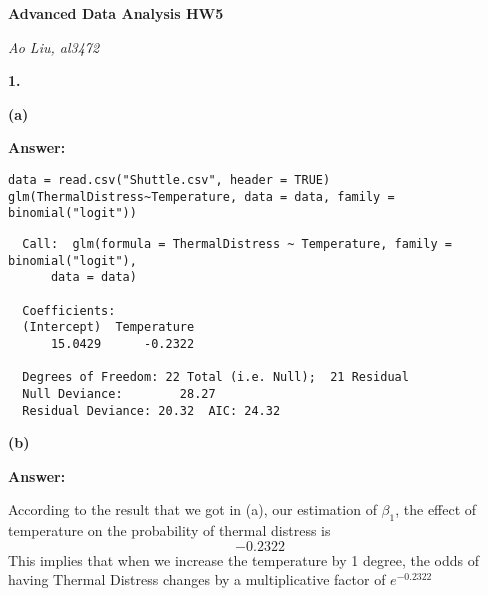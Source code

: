 \documentclass[letterpaper,11pt]{article}
\begin{document}
\begin{center}
	\textbf{\Huge{Advanced Data Analysis HW5}}
\end{center}

\begin{center}
	\textsl{Ao Liu, al3472}
\end{center}

\bigbreak
\bigbreak
\bigbreak



\begin{addmargin}[-2em]{0em}
  \large{\textbf{1. }}
\end{addmargin}
\textbf{}\par

\begin{addmargin}[-1.1em]{0em}
  \textbf{(a)}\par
\end{addmargin}
\textbf{}\par
\bigbreak
\begin{addmargin}[-0.5em]{0em}
  \textbf{Answer: }
\end{addmargin}

\begin{lstlisting}
data = read.csv("Shuttle.csv", header = TRUE)
glm(ThermalDistress~Temperature, data = data, family = binomial("logit"))
\end{lstlisting}

\begin{lstlisting}
  Call:  glm(formula = ThermalDistress ~ Temperature, family = binomial("logit"),
      data = data)

  Coefficients:
  (Intercept)  Temperature
      15.0429      -0.2322

  Degrees of Freedom: 22 Total (i.e. Null);  21 Residual
  Null Deviance:	    28.27
  Residual Deviance: 20.32 	AIC: 24.32
\end{lstlisting}


\begin{addmargin}[-1.1em]{0em}
  \textbf{(b)}\par
\end{addmargin}
\textbf{}\par
\bigbreak
\begin{addmargin}[-0.5em]{0em}
  \textbf{Answer: }
\end{addmargin}

According to the result that we got in (a), our estimation of $\beta_1$, the effect of temperature on the probability of thermal distress is $$-0.2322$$
This implies that when we increase the temperature by 1 degree, the odds of having Thermal Distress changes by a multiplicative factor of $e^{-0.2322}$
\end{document}
